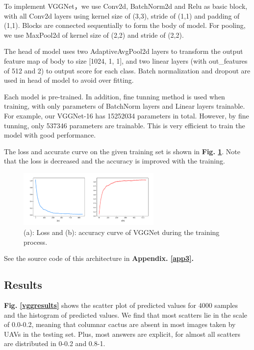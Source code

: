 \documentclass[10pt,twocolumn,letterpaper]{article}
\begin{document}
To implement \textsf{VGGNet}，we use Conv2d, BatchNorm2d and Relu as basic block, with all Conv2d layers using kernel size of (3,3), stride of (1,1) and padding of (1,1). Blocks are connected sequentially to form the body of model. For pooling, we use MaxPool2d of kernel size of (2,2) and stride of (2,2). 

The head of model uses two AdaptiveAvgPool2d layers to transform the output feature map of body to size [1024, 1, 1], and two linear layers (with out\_features of 512 and 2) to output score for each class. Batch normalization and dropout are used in head of model to avoid over fitting.

Each model is pre-trained. In addition, fine tunning method is used when training, with only parameters of BatchNorm layers and Linear layers trainable. For example, our \textsf{VGGNet-16} has 15252034 parameters in total. However, by fine tunning, only 537346 parameters are trainable. This is very efficient to train the model with good performance.

The loss and accurate curve on the given training set is shown in \textbf{Fig. \ref{vggacc}}. Note that the loss is decreased and the accuracy is improved with the training.

\begin{figure}[h]
\centering
\includegraphics[width=7cm]{vgg_acc.pdf}
\caption{(a): Loss and (b): accuracy curve of \textsf{VGGNet} during the training process.}
\label{vggacc}
\end{figure}

See the source code of this architecture in \textbf{Appendix. \ref{app3}.}

\subsection{Results}

\textbf{Fig. \ref{vggresults}} shows the scatter plot of predicted values for 4000 samples and the histogram of predicted values. We find that most scatters lie in the scale of 0.0-0.2, meaning that columnar cactus are absent in most images taken by UAVs in the testing set. Plus, most answers are explicit, for almost all scatters are distributed in 0-0.2 and 0.8-1.
\end{document}

